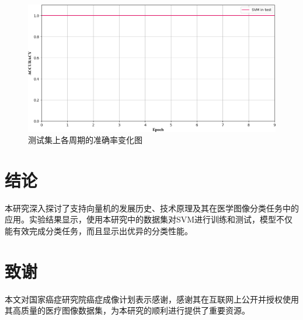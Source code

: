 \documentclass[twocolumn]{article}
\begin{document}
\begin{figure}[h]
    \centering
    \includegraphics[width=1.0\linewidth]{exp_log/train440_valid024/ACCURACY_test}
    \caption{测试集上各周期的准确率变化图}
    \label{fig:acc_test}
\end{figure}

\section{结论}
本研究深入探讨了支持向量机的发展历史、技术原理及其在医学图像分类任务中的应用。实验结果显示，使用本研究中的数据集对SVM进行训练和测试，模型不仅能有效完成分类任务，而且显示出优异的分类性能。

\section*{致谢}
本文对国家癌症研究院癌症成像计划表示感谢，感谢其在互联网上公开并授权使用其高质量的医疗图像数据集，为本研究的顺利进行提供了重要资源。




\end{document}
